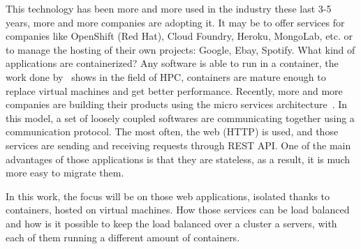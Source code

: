 This technology has been more and more used in the industry these last 3-5
years, more and more companies are adopting it. It may be to offer services for
companies like OpenShift (Red Hat), Cloud Foundry, Heroku, MongoLab, etc. or to
manage the hosting of their own projects: Google, Ebay, Spotify. What kind of
applications are containerized? Any software is able to run in a container, the
work done by~\cite{hpccontainers} shows in the field of HPC, containers are
mature enough to replace virtual machines and get better performance. Recently,
more and more companies are building their products using the micro services
architecture~\cite*{microservices}. In this model, a set of loosely coupled
softwares are communicating together using a communication protocol. The most
often, the web (HTTP) is used, and those services are sending and receiving
requests through REST API. One of the main advantages of those applications is
that they are stateless, as a result, it is much more easy to migrate them.

In this work, the focus will be on those web applications, isolated thanks to
containers, hosted on virtual machines. How those services can be load balanced and
how is it possible to keep the load balanced over a cluster a servers, with each
of them running a different amount of containers. 
 
